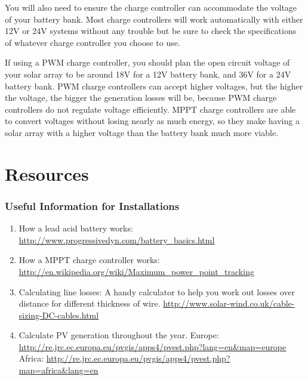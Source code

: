 \documentclass{article}
\theoremstyle{definition}
\theoremstyle{definition}
\theoremstyle{remark}
\begin{document}
  You will also need to ensure the charge controller can accommodate the voltage of your battery bank. Most charge controllers will work automatically with either 12V or 24V systems without any trouble but be sure to check the specifications of whatever charge controller you choose to use.

  If using a PWM charge controller, you should plan the open circuit voltage of your solar array to be around 18V for a 12V battery bank, and 36V for a 24V battery bank. PWM charge controllers can accept higher voltages, but the higher the voltage, the bigger the generation losses will be, because PWM charge controllers do not regulate voltage efficiently. MPPT charge controllers are able to convert voltages without losing nearly as much energy, so they make having a solar array with a higher voltage than the battery bank much more viable.


{\color{blue}\section{Resources}} %
\label{sec:resources}

  \subsubsection{Useful Information for Installations} %
  \label{ssub:useful_information_for_installations}

    \begin{enumerate}
      \item How a lead acid battery works: \href{http://www.progressivedyn.com/battery\_basics.html}{\underline{http://www.progressivedyn.com/battery\_basics.html}}
      \item How a MPPT charge controller works: \newline
      \href{http://en.wikipedia.org/wiki/Maximum\_power\_point\_tracking}{\underline{http://en.wikipedia.org/wiki/Maximum\_power\_point\_tracking}}
      \item Calculating line losses: A handy calculator to help you work out losses over distance for different \newline
      thickness of wire. \href{http://www.solar-wind.co.uk/cable-sizing-DC-cables.html}{\underline{http://www.solar-wind.co.uk/cable-sizing-DC-cables.html}}
      \item Calculate PV generation throughout the year. \newline
      Europe: \href{http://re.jrc.ec.europa.eu/pvgis/apps4/pvest.php?lang=en\&map=europe}{\underline{http://re.jrc.ec.europa.eu/pvgis/apps4/pvest.php?lang=en\&map=europe}} \newline
      Africa: \href{http://re.jrc.ec.europa.eu/pvgis/apps4/pvest.php?map=africa\&lang=en}{\underline{http://re.jrc.ec.europa.eu/pvgis/apps4/pvest.php?map=africa\&lang=en}}
    \end{enumerate}
  
\end{document}
